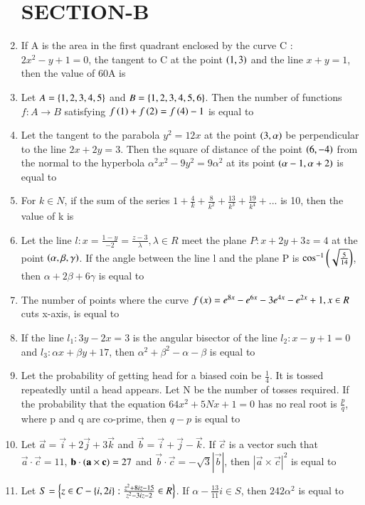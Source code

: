 \documentclass[journal]{IEEEtran}
\numberwithin{equation}{enumi}
\numberwithin{figure}{enumi}
\begin{document}
\begin{enumerate}
\section{SECTION-B}
\item If A is the area in the first quadrant enclosed by the curve C : $2x^2-y+1=0$, the tangent to C at the point $\left(1,3\right)$ and the line $x+y=1$, then the value of 60A is

\item Let $A = \left\{1,2,3,4,5\right\}$ and $B = \left\{1,2,3,4,5,6\right\}$. Then the number of functions $f : A \rightarrow B$ satisfying $f\left(1\right)+f\left(2\right) = f\left(4\right)-1$ is equal to

\item Let the tangent to the parabola $y^2 = 12x$ at the point $\left(3,\alpha\right)$ be perpendicular to the line $2x+2y=3$. Then the square of distance of the point $\left(6,-4\right)$ from the normal to the hyperbola $\alpha^2x^2 - 9y^2 = 9\alpha^2$ at its point $\left(\alpha-1,\alpha+2\right)$ is equal to

\item For $k \in N$, if the sum of the series $1+\frac{4}{k}+\frac{8}{k^2}+\frac{13}{k^3}+\frac{19}{k^4}+ ...$ is 10, then the value of k is

\item Let the line $l : x = \frac{1-y}{-2} = \frac{z-3}{\lambda}, \lambda \in R$ meet the plane $P : x+2y+3z=4$ at the point $\left(\alpha,\beta,\gamma\right)$. If the angle between the line l and the plane P is $\cos^{-1}\left(\sqrt{\frac{5}{14}}\right)$, then $\alpha+2\beta+6\gamma$ is equal to

\item The number of points where the curve $f\left(x\right)  = e^{8x}-e^{6x}-3e^{4x}-e^{2x}+1, x \in R$ cuts x-axis, is equal to

\item If the line $l_1 : 3y-2x=3$ is the angular bisector of the line $l_2 : x-y+1=0$ and $l_3 : \alpha x+\beta y+17$, then $\alpha^2+\beta^2-\alpha-\beta$ is equal to

\item Let the probability of getting head for a biased coin be $\frac{1}{4}$. It is tossed repeatedly until a head appears. Let N be the number of tosses required. If the probability that the equation $64x^2+5Nx+1=0$ has no real root is $\frac{p}{q}$, where p and q are co-prime, then $q-p$ is equal to

\item Let $\vec{a} = \vec{i}+2\vec{j}+3\vec{k}$ and $\vec{b} = \vec{i}+\vec{j}-\vec{k}$. If $\vec{c}$ is a vector such that $\vec{a}\cdot\vec{c}=11$, $\mathbf{b}\cdot\left(\mathbf{a}\times\mathbf{c}\right)=27$ and $\vec{b}\cdot\vec{c}=-\sqrt{3}|\vec{b}|$, then $|\vec{a}\times\vec{c}|^2$ is equal to

\item Let $S = \left\{z \in C-\left\{i,2i\right\}:\frac{z^2+8iz-15}{z^2-3iz-2} \in R\right\}$. If $\alpha-\frac{13}{11}i \in S$, then $242\alpha^2$ is equal to

\end{enumerate}
\end{document}
